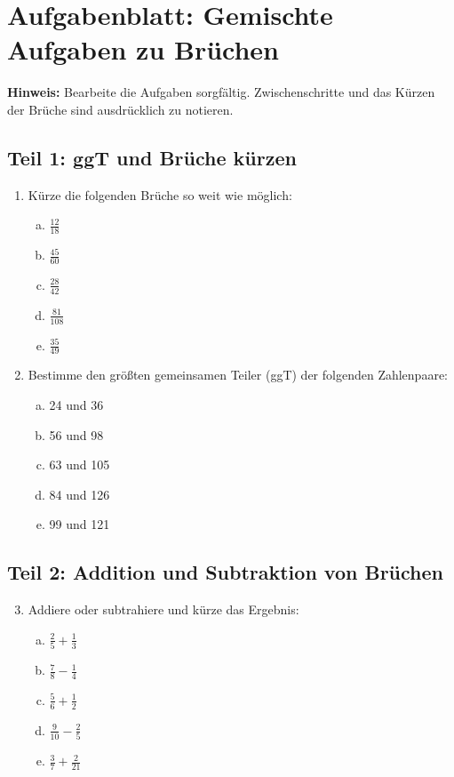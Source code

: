 

\section*{Aufgabenblatt: Gemischte Aufgaben zu Brüchen}

\textbf{Hinweis:} Bearbeite die Aufgaben sorgfältig. Zwischenschritte und das Kürzen der Brüche sind ausdrücklich zu notieren.

\subsection*{Teil 1: ggT und Brüche kürzen}
\begin{enumerate}
    \item Kürze die folgenden Brüche so weit wie möglich:
    \begin{enumerate}[a)]
        \item $\frac{12}{18}$
        \item $\frac{45}{60}$
        \item $\frac{28}{42}$
        \item $\frac{81}{108}$
        \item $\frac{35}{49}$
    \end{enumerate}
    \item Bestimme den größten gemeinsamen Teiler (ggT) der folgenden Zahlenpaare:
    \begin{enumerate}[a)]
        \item 24 und 36
        \item 56 und 98
        \item 63 und 105
        \item 84 und 126
        \item 99 und 121
    \end{enumerate}
\end{enumerate}

\subsection*{Teil 2: Addition und Subtraktion von Brüchen}
\begin{enumerate}
    \setcounter{enumi}{2}
    \item Addiere oder subtrahiere und kürze das Ergebnis:
    \begin{enumerate}[a)]
        \item $\frac{2}{5} + \frac{1}{3}$
        \item $\frac{7}{8} - \frac{1}{4}$
        \item $\frac{5}{6} + \frac{1}{2}$
        \item $\frac{9}{10} - \frac{2}{5}$
        \item $\frac{3}{7} + \frac{2}{21}$
    \end{enumerate}
\end{enumerate}

